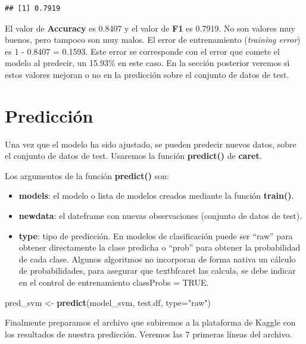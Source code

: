 \documentclass[]{article}
\newenvironment{Shaded}{\begin{snugshade}}{\end{snugshade}}
\newcommand{\DataTypeTok}[1]{\textcolor[rgb]{0.13,0.29,0.53}{#1}}
\newcommand{\KeywordTok}[1]{\textcolor[rgb]{0.13,0.29,0.53}{\textbf{#1}}}
\newcommand{\NormalTok}[1]{#1}
\newcommand{\StringTok}[1]{\textcolor[rgb]{0.31,0.60,0.02}{#1}}
\begin{document}
\begin{verbatim}
## [1] 0.7919
\end{verbatim}

El valor de \textbf{Accuracy} es 0.8407 y el valor de \textbf{F1} es 0.7919. No son valores muy buenos, pero tampoco son muy malos. El error de entrenamiento (\emph{training error}) es 1 - 0.8407 = 0.1593. Este error se corresponde con el error que comete el modelo al predecir, un 15.93\% en este caso. En la sección posterior veremos si estos valores mejoran o no en la predicción sobre el conjunto de datos de test. 

\hypertarget{predicciuxf3n}{%
\section{Predicción}\label{predicciuxf3n}}

Una vez que el modelo ha sido ajustado, se pueden predecir nuevos datos, sobre el conjunto de datos de test. Usaremos la función \textbf{predict()} de \textbf{caret}. 

Los argumentos de la función \textbf{predict()}  son:


\begin{itemize}
	\item \textbf{models}: el modelo o lista de modelos creados mediante la función \textbf{train()}.
	\item \textbf{newdata}: el dateframe con nuevas observaciones (conjunto de datos de test).
	\item \textbf{type}: tipo de predicción. En modelos de clasificación puede ser “raw” para obtener directamente la clase predicha o “prob” para obtener la probabilidad de cada clase. Algunos algoritmos no incorporan de forma nativa un cálculo de probabilidades, para asegurar que textbf{caret} las calcula, se debe indicar en el control de entrenamiento classProbs = TRUE.
\end{itemize}

\vspace{2mm}

\begin{Shaded}
\begin{Highlighting}[]
\NormalTok{pred_svm <-}\StringTok{ }\KeywordTok{predict}\NormalTok{(model_svm, test.df, }\DataTypeTok{type=}\StringTok{"raw"}\NormalTok{)}
\end{Highlighting}
\end{Shaded}

Finalmente preparamos el archivo que subiremos a la plataforma de Kaggle con los resultados de nuestra predicción. Veremos las 7 primeras líneas del archivo.
\end{document}
